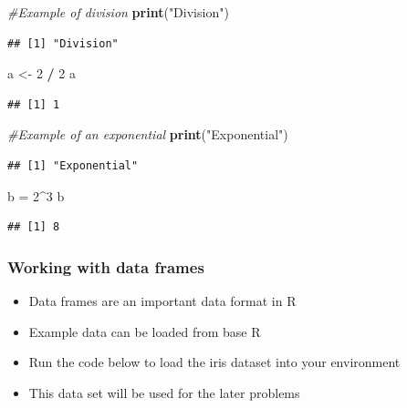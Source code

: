 \documentclass[]{article}
\newenvironment{Shaded}{\begin{snugshade}}{\end{snugshade}}
\newcommand{\CommentTok}[1]{\textcolor[rgb]{0.56,0.35,0.01}{\textit{#1}}}
\newcommand{\DecValTok}[1]{\textcolor[rgb]{0.00,0.00,0.81}{#1}}
\newcommand{\KeywordTok}[1]{\textcolor[rgb]{0.13,0.29,0.53}{\textbf{#1}}}
\newcommand{\NormalTok}[1]{#1}
\newcommand{\OperatorTok}[1]{\textcolor[rgb]{0.81,0.36,0.00}{\textbf{#1}}}
\newcommand{\StringTok}[1]{\textcolor[rgb]{0.31,0.60,0.02}{#1}}
\providecommand{\tightlist}{%
  \setlength{\itemsep}{0pt}\setlength{\parskip}{0pt}}
\begin{document}
\begin{Shaded}
\begin{Highlighting}[]
\CommentTok{#Example of division}
\KeywordTok{print}\NormalTok{(}\StringTok{"Division"}\NormalTok{)}
\end{Highlighting}
\end{Shaded}

\begin{verbatim}
## [1] "Division"
\end{verbatim}

\begin{Shaded}
\begin{Highlighting}[]
\NormalTok{a <-}\StringTok{ }\DecValTok{2} \OperatorTok{/}\StringTok{ }\DecValTok{2}
\NormalTok{a}
\end{Highlighting}
\end{Shaded}

\begin{verbatim}
## [1] 1
\end{verbatim}

\begin{Shaded}
\begin{Highlighting}[]
\CommentTok{#Example of an exponential}
\KeywordTok{print}\NormalTok{(}\StringTok{"Exponential"}\NormalTok{)}
\end{Highlighting}
\end{Shaded}

\begin{verbatim}
## [1] "Exponential"
\end{verbatim}

\begin{Shaded}
\begin{Highlighting}[]
\NormalTok{b =}\StringTok{ }\DecValTok{2}\OperatorTok{^}\DecValTok{3}
\NormalTok{b}
\end{Highlighting}
\end{Shaded}

\begin{verbatim}
## [1] 8
\end{verbatim}

\hypertarget{working-with-data-frames}{%
\subsubsection{Working with data
frames}\label{working-with-data-frames}}

\begin{itemize}
\tightlist
\item
  Data frames are an important data format in R
\item
  Example data can be loaded from base R
\item
  Run the code below to load the iris dataset into your environment
\item
  This data set will be used for the later problems
\end{itemize}
\end{document}

